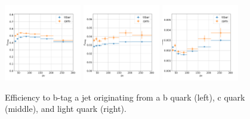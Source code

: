 \begin{figure}[h!]
    \centering
    \includegraphics[width=0.3\textwidth]{chapters/Appendix/sectionBtag/figures/bmva_mceff_vs_pt_b}
    \includegraphics[width=0.3\textwidth]{chapters/Appendix/sectionBtag/figures/bmva_mceff_vs_pt_c}
    \includegraphics[width=0.3\textwidth]{chapters/Appendix/sectionBtag/figures/bmva_mceff_vs_pt_usdg}
    \caption{Efficiency to b-tag a jet originating from a b quark (left), c quark (middle), and light quark (right).
    \label{fig:btag_eff}
    }
\end{figure}

\FloatBarrier

